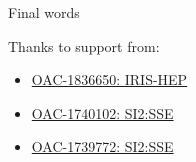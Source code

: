 \begin{frame}{Final words}

    \begin{block}{Thanks to support from:}
    \begin{itemize}
        \item \href{https://www.nsf.gov/awardsearch/showAward?AWD_ID=1836650}{OAC-1836650: IRIS-HEP}
        \item \href{https://www.nsf.gov/awardsearch/showAward?AWD_ID=1740102}{OAC-1740102: SI2:SSE}
        \item \href{https://www.nsf.gov/awardsearch/showAward?AWD_ID=1739772}{OAC-1739772: SI2:SSE}
    \end{itemize}
    \end{block}
\end{frame}
